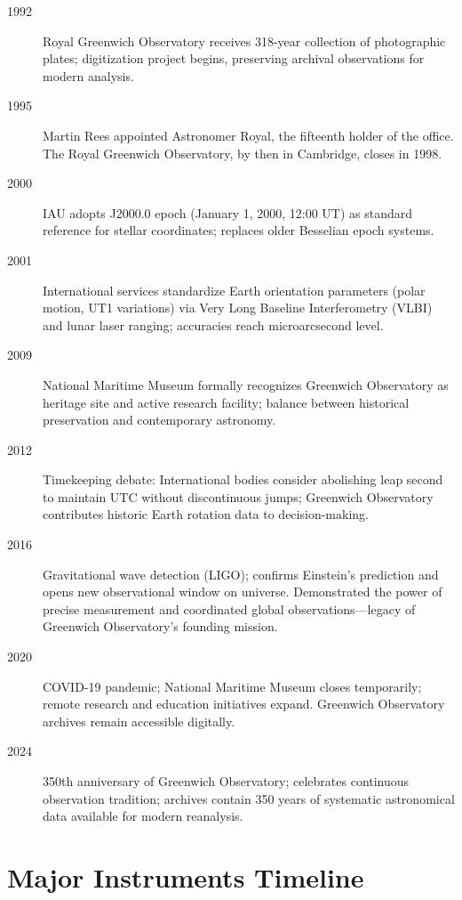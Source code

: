 \begin{description}
\item[1992] Royal Greenwich Observatory receives 318-year collection of photographic plates; digitization project begins, preserving archival observations for modern analysis.

\item[1995] Martin Rees appointed Astronomer Royal, the fifteenth holder of the office. The Royal Greenwich Observatory, by then in Cambridge, closes in 1998.

\item[2000] IAU adopts J2000.0 epoch (January 1, 2000, 12:00 UT) as standard reference for stellar coordinates; replaces older Besselian epoch systems.

\item[2001] International services standardize Earth orientation parameters (polar motion, UT1 variations) via Very Long Baseline Interferometry (VLBI) and lunar laser ranging; accuracies reach microarcsecond level.

\item[2009] National Maritime Museum formally recognizes Greenwich Observatory as heritage site and active research facility; balance between historical preservation and contemporary astronomy.

\item[2012] Timekeeping debate: International bodies consider abolishing leap second to maintain UTC without discontinuous jumps; Greenwich Observatory contributes historic Earth rotation data to decision-making.

\item[2016] Gravitational wave detection (LIGO); confirms Einstein's prediction and opens new observational window on universe. Demonstrated the power of precise measurement and coordinated global observations---legacy of Greenwich Observatory's founding mission.

\item[2020] COVID-19 pandemic; National Maritime Museum closes temporarily; remote research and education initiatives expand. Greenwich Observatory archives remain accessible digitally.

\item[2024] 350th anniversary of Greenwich Observatory; celebrates continuous observation tradition; archives contain 350 years of systematic astronomical data available for modern reanalysis.

\end{description}

\section{Major Instruments Timeline}

